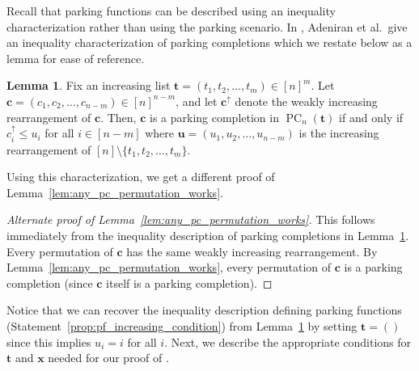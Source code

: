 \documentclass{amsart}
\theoremstyle{definition}
\newtheorem{lemma}[theorem]{Lemma}
\numberwithin{equation}{section}
\newcommand{\PC}{\operatorname{PC}} %
\begin{document}
Recall that parking functions can be described using an inequality characterization rather than using the parking scenario.
In \cite[Definition~2.1]{bib:ParkingCompletions}, Adeniran et al.\ give an inequality characterization of parking completions which we restate below as a lemma for ease of reference.

\begin{lemma}\label{lem:pc_increasing_condition}
    Fix an increasing list $\mathbf{t} = (t_1, t_2, \ldots, t_m)\in [n]^m$. Let $\mathbf{c} = (c_1, c_2, \ldots, c_{n-m}) \in [n]^{n-m}$, and
    let $\mathbf{c}^\uparrow$ denote the weakly increasing rearrangement of $\mathbf{c}$.
    Then, $\mathbf{c}$ is a parking completion in $\PC_n(\mathbf{t})$ if and only if $c^\uparrow_i \leq u_i$ for all $i \in [n-m]$ where $\mathbf{u} = (u_1, u_2, \ldots, u_{n-m})$ is the increasing rearrangement of $[n] \setminus\{t_1,t_2,\ldots,t_m\}$.
\end{lemma}

Using this characterization, we get a different proof of Lemma~\ref{lem:any_pc_permutation_works}.

\begin{proof}[Alternate proof of Lemma~\ref{lem:any_pc_permutation_works}]
    This follows immediately from the inequality description of parking completions in Lemma~\ref{lem:pc_increasing_condition}.
    Every permutation of $\mathbf{c}$ has the same weakly increasing rearrangement.
    By Lemma~\ref{lem:any_pc_permutation_works}, every permutation of $\mathbf{c}$ is a parking completion (since $\mathbf{c}$ itself is a parking completion).
\end{proof}

Notice that we can recover the inequality description defining parking functions (Statement~\eqref{prop:pf_increasing_condition}) from Lemma~\ref{lem:pc_increasing_condition} by setting $\mathbf{t} = ()$ since this implies $u_i = i$ for all $i$.
Next, we describe the appropriate conditions for $\mathbf{t}$ and $\mathbf{x}$ needed for our proof of .
\end{document}
